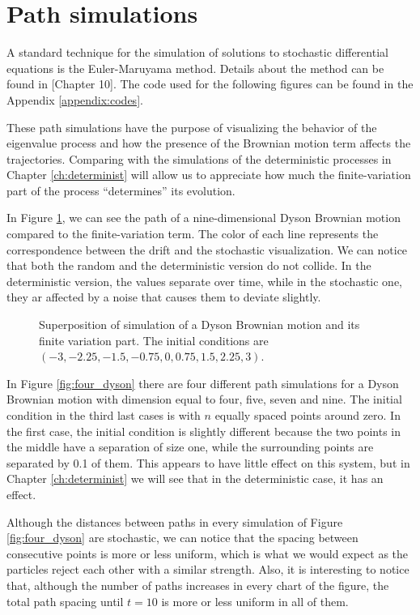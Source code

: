 \section{Path simulations}

A standard technique for the simulation of solutions to stochastic differential equations is the Euler-Maruyama method. Details about the method can be found in \cite{book:asmussen}[Chapter 10]. The code used for the following figures can be found in the Appendix \ref{appendix:codes}. 

These path simulations have the purpose of visualizing the behavior of the eigenvalue process and how the presence of the Brownian motion term affects the trajectories. Comparing with the simulations of the deterministic processes in Chapter \ref{ch:determinist} will allow us to appreciate how much the finite-variation part of the process ``determines'' its evolution.

In Figure \ref{fig:dyson_comparison}, we can see the path of a nine-dimensional Dyson Brownian motion compared to the finite-variation term. The color of each line represents the correspondence between the drift and the stochastic visualization. We can notice that both the random and the deterministic version do not collide. In the deterministic version, the values separate over time, while in the stochastic one, they ar affected by a noise that causes them to deviate slightly.

\begin{figure}[h!] \centering 
    
    \caption{Superposition of simulation of a Dyson Brownian motion and its finite variation part. The initial conditions are $(-3, -2.25, -1.5, -0.75, 0, 0.75, 1.5, 2.25, 3)$.\label{fig:dyson_comparison}}
\end{figure}

In Figure \ref{fig:four_dyson} there are four different path simulations for a Dyson Brownian motion with dimension equal to four, five, seven and nine. The initial condition in the third last cases is with $n$ equally spaced points around zero. In the first case, the initial condition is slightly different because the two points in the middle have a separation of size one, while the surrounding points are separated by 0.1 of them. This appears to have little effect on this system, but in Chapter \ref{ch:determinist} we will see that in the deterministic case, it has an effect.

Although the distances between paths in every simulation of Figure \ref{fig:four_dyson} are stochastic, we can notice that the spacing between consecutive points is more or less uniform, which is what we would expect as the particles reject each other with a similar strength. Also, it is interesting to notice that, although the number of paths increases in every chart of the figure, the total path spacing until $t=10$ is more or less uniform in all of them. 

